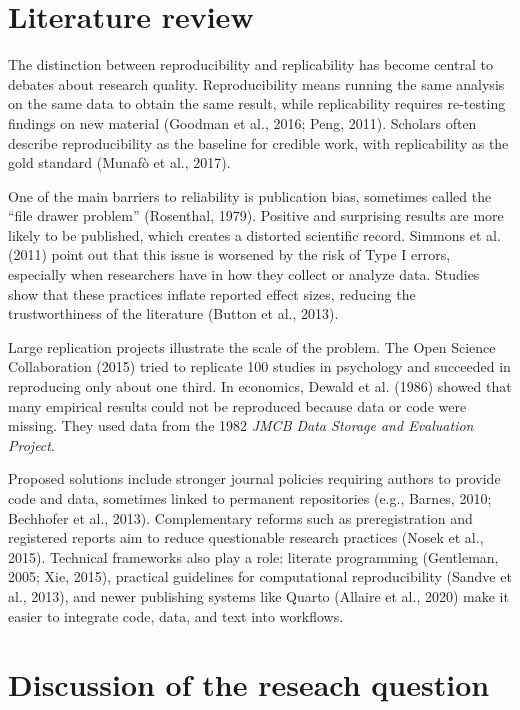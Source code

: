 \documentclass[
  a4paper,
]{article}
\begin{document}
\section{Literature review}\label{literature-review}

The distinction between reproducibility and replicability has become
central to debates about research quality. Reproducibility means running
the same analysis on the same data to obtain the same result, while
replicability requires re-testing findings on new material (Goodman et
al., 2016; Peng, 2011). Scholars often describe reproducibility as the
baseline for credible work, with replicability as the gold standard
(Munafò et al., 2017).

One of the main barriers to reliability is publication bias, sometimes
called the ``file drawer problem'' (Rosenthal, 1979). Positive and
surprising results are more likely to be published, which creates a
distorted scientific record. Simmons et al. (2011) point out that this
issue is worsened by the risk of Type I errors, especially when
researchers have in how they collect or analyze data. Studies show that
these practices inflate reported effect sizes, reducing the
trustworthiness of the literature (Button et al., 2013).

Large replication projects illustrate the scale of the problem. The Open
Science Collaboration (2015) tried to replicate 100 studies in
psychology and succeeded in reproducing only about one third. In
economics, Dewald et al. (1986) showed that many empirical results could
not be reproduced because data or code were missing. They used data from
the 1982 \emph{JMCB Data Storage and Evaluation Project}.

Proposed solutions include stronger journal policies requiring authors
to provide code and data, sometimes linked to permanent repositories
(e.g., Barnes, 2010; Bechhofer et al., 2013). Complementary reforms such
as preregistration and registered reports aim to reduce questionable
research practices (Nosek et al., 2015). Technical frameworks also play
a role: literate programming (Gentleman, 2005; Xie, 2015), practical
guidelines for computational reproducibility (Sandve et al., 2013), and
newer publishing systems like Quarto (Allaire et al., 2020) make it
easier to integrate code, data, and text into workflows.

\section{Discussion of the reseach
question}\label{discussion-of-the-reseach-question}
\end{document}
